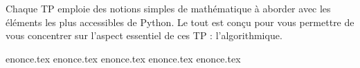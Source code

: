 \documentclass[a4paper,11pt]{article}
\begin{document}
Chaque TP emploie des notions simples de mathématique à aborder avec 
les éléments les plus accessibles de Python. Le tout est conçu pour vous
permettre de vous concentrer sur l'aspect essentiel de ces TP :
l'algorithmique. 

{enonce.tex}
{enonce.tex}
{enonce.tex}
{enonce.tex}
{enonce.tex}


%
%
\end{document}
